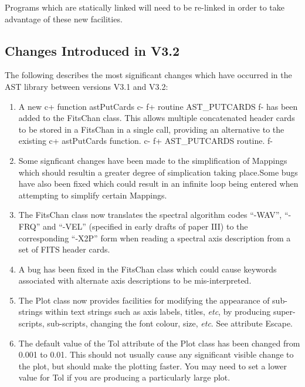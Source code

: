 \documentclass[twoside,11pt]{article}
\begin{document}
Programs which are statically linked will need to be re-linked in
order to take advantage of these new facilities.


\subsection{Changes Introduced in V3.2}

The following describes the most significant changes which have
occurred in the AST library between versions V3.1 and V3.2:

\begin{enumerate}

\item A new
c+
function astPutCards
c-
f+
routine AST\_PUTCARDS
f-
has been added to the FitsChan class. This allows multiple concatenated header
cards to be stored in a FitsChan in a single call, providing an alternative to
the existing
c+
astPutCards function.
c-
f+
AST\_PUTCARDS routine.
f-

\item Some signficant changes have been made to the simplification of Mappings
 which should resultin a greater degree of simplication taking place.Some
 bugs have also been fixed which could result in an infinite loop being
 entered when attempting to simplify certain Mappings.

\item The FitsChan class now translates the spectral algorithm codes
``-WAV'', ``-FRQ'' and ``-VEL'' (specified in early drafts of paper III) to
the corresponding ``-X2P'' form when reading a spectral axis description
from a set of FITS header cards.

\item A bug has been fixed in the FitsChan class which could cause
keywords associated with alternate axis descriptions to be mis-interpreted.

\item The Plot class now provides facilities for modifying the appearance
of sub-strings within text strings such as axis labels, titles, \emph{etc},
by producing super-scripts, sub-scripts, changing the font colour, size,
\emph{etc}. See attribute Escape.

\item The default value of the Tol attribute of the Plot class has been
changed from 0.001 to 0.01. This should not usually cause any significant
visible change to the plot, but should make the plotting faster. You may
need to set a lower value for Tol if you are producing a particularly
large plot.


\end{enumerate}
\end{document}
